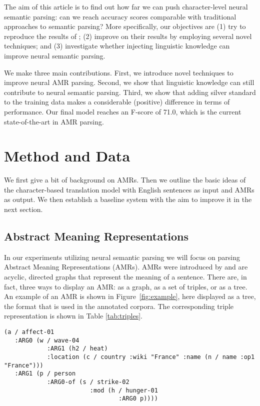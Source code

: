 \documentclass[a4paper,10pt,twoside]{article}
\begin{document}
The aim of this article is to find out how far we can push character-level neural semantic parsing: can we reach accuracy scores comparable with traditional approaches to semantic parsing? 
More specifically, our objectives are (1) try to reproduce the results of ; (2) improve on their results by employing several novel techniques; and (3) investigate whether injecting linguistic knowledge can improve neural semantic parsing.

We make three main contributions. First, we introduce novel techniques to improve neural AMR parsing. Second, we show that linguistic knowledge can still contribute to neural semantic parsing. Third, we show that adding silver standard to the training data makes a considerable (positive) difference in terms of performance. Our final model reaches an F-score of 71.0, which is the current state-of-the-art in AMR parsing.

\section{Method and Data}

We first give a bit of background on AMRs. Then we outline the basic ideas of the character-based translation model with English sentences as input and AMRs as output. We then establish a baseline system with the aim to improve it in the next section.

\subsection{Abstract Meaning Representations}

In our experiments utilizing neural semantic parsing we will focus on parsing Abstract Meaning Representations (AMRs). AMRs were introduced by  and are acyclic, directed graphs that represent the meaning of a sentence. There are, in fact, three ways to display an AMR: as a graph, as a set of triples, or as a tree. An example of an AMR is shown in Figure~\ref{fig:example}, here displayed as a tree, the format that is used in the annotated corpora. The corresponding triple representation is shown in Table \ref{tab:triples}.

\begin{figure*}[!htb]
{
  \begin{minipage}{.7\textwidth}\centering
  \begin{Verbatim}[commandchars=\\\{\}]
(a / affect-01
   :ARG0 (w / wave-04
            :ARG1 (h2 / heat)
            :location (c / country :wiki "France" :name (n / name :op1 "France")))
   :ARG1 (p / person
            :ARG0-of (s / strike-02
                        :mod (h / hunger-01
                                :ARG0 p))))
\end{Verbatim}
  \end{minipage}
  \caption{\label{fig:example}AMR representing the meaning of \emph{Hunger strikers were affected by France's heat wave.}}
}
\end{figure*}
\end{document}
